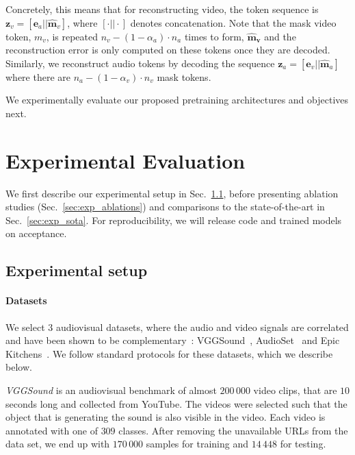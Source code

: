 \documentclass[10pt,twocolumn,letterpaper]{article}
\begin{document}
Concretely, this means that for reconstructing video, the token sequence is $\mathbf{z}_v = [\mathbf{e}_a || \mathbf{\hat{m}}_v]$, where $[\cdot || \cdot]$ denotes concatenation.
Note that the mask video token, $m_v$, is repeated $n_v - (1 - \alpha_a) \cdot n_a$ times to form, $\mathbf{\hat{m}_v}$ and the reconstruction error is only computed on these tokens once they are decoded.
Similarly, we reconstruct audio tokens by decoding the sequence $\mathbf{z}_a = [\mathbf{e}_v || \mathbf{\hat{m}}_a]$ where there are $n_a - (1 - \alpha_v) \cdot n_v$ mask tokens.

We experimentally evaluate our proposed pretraining architectures and objectives next.




 \vspace{-1mm}
\section{Experimental Evaluation}
\vspace{-1mm}

We first describe our experimental setup in Sec.~\ref{sec:exp_setup}, before presenting ablation studies (Sec.~\ref{sec:exp_ablations}) and comparisons to the state-of-the-art in Sec.~\ref{sec:exp_sota}.
For reproducibility, we will release code and trained models on acceptance.

\vspace{-0.2\baselineskip}
\subsection{Experimental setup}
\label{sec:exp_setup}

\paragraph{Datasets}

We select 3 audiovisual datasets, where the audio and video signals are correlated 
and have been shown to be complementary~\cite{nagrani2021attention, jaegle2021perceiver, wang2020makes}:
VGGSound~\cite{chen2020alarge}, AudioSet~\cite{gemmeke2017audio} and Epic Kitchens~\cite{damen2022rescaling}.
We follow standard protocols for these datasets, which we describe below.



\noindent\quad\textit{VGGSound}\cite{chen2020alarge} is an audiovisual benchmark of almost $200 \, 000$ video clips, that are $10$ seconds long and collected from YouTube.
The videos were selected such that the object that is generating the sound is also visible in the video.
Each video is annotated with one of $309$ classes.
After removing the unavailable URLs from the data set, we end up with $170 \, 000$ samples for training and $14 \, 448$ for testing.
\end{document}
